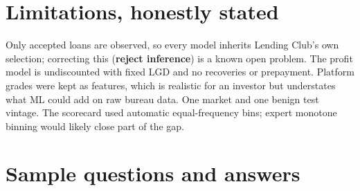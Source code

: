 \documentclass[a4paper,11pt]{article}
\newcommand{\term}[1]{\textbf{#1}}
\begin{document}
\section{Limitations, honestly stated}

Only accepted loans are observed, so every model inherits Lending Club's own selection; correcting this (\term{reject inference}) is a known open problem. The profit model is undiscounted with fixed LGD and no recoveries or prepayment. Platform grades were kept as features, which is realistic for an investor but understates what ML could add on raw bureau data. One market and one benign test vintage. The scorecard used automatic equal-frequency bins; expert monotone binning would likely close part of the gap.

\section{Sample questions and answers}
\end{document}
